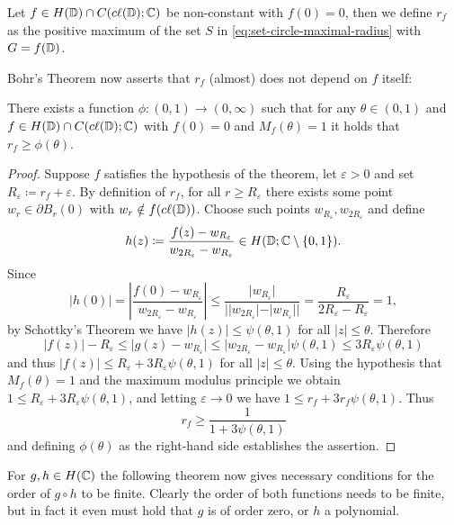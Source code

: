 \begin{definition}
    Let $f \in H(\mathbb{D}) \cap C(c\ell({\mathbb{D}}); \mathbb{C})$ be non-constant with $f(0) = 0$, then we define $r_f$ as the positive maximum of the set $S$ in \eqref{eq:set-circle-maximal-radius} with $G = f(\mathbb{D})$.
\end{definition}

Bohr's Theorem now asserts that $r_f$ (almost) does not depend on $f$ itself:

\begin{theorem}[Bohr] \label{thm:bohr}
    There exists a function ${\phi : (0, 1) \to (0, \infty)}$ such that for any $\theta \in (0, 1)$ and $f \in H(\mathbb{D}) \cap C(c\ell({\mathbb{D}}); \mathbb{C})$ with $f(0) = 0$ and $M_f(\theta) = 1$ it holds that $r_f \geq \phi(\theta)$.
\end{theorem}

\begin{proof}
    Suppose $f$ satisfies the hypothesis of the theorem, let $\varepsilon > 0$ and set $R_\varepsilon \coloneqq r_f + \varepsilon$. By definition of $r_f$, for all $r \geq R_\varepsilon$ there exists some point $w_r \in \partial B_r(0)$ with $w_r \notin f(c\ell({\mathbb{D}}))$. Choose such points $w_{R_\varepsilon}, w_{2 R_\varepsilon}$ and define
    $$ h(z) \coloneqq \frac{f(z) - w_{R_\varepsilon}}{w_{2 R_\varepsilon} - w_{R_\varepsilon}} \in H(\mathbb{D}; \mathbb{C} \setminus \{ 0, 1 \}). $$
    Since
    $$ \vert h(0) \vert = \left\vert \frac{f(0) - w_{R_\varepsilon}}{w_{2 R_\varepsilon} - w_{R_\varepsilon}} \right\vert \leq \frac{\vert w_{R_\varepsilon} \vert}{\vert \vert w_{2 R_\varepsilon} \vert - \vert w_{R_\varepsilon} \vert \vert} = \frac{R_\varepsilon}{2 R_\varepsilon - R_\varepsilon} = 1, $$
    by Schottky's Theorem we have $\vert h(z) \vert \leq \psi(\theta, 1)$ for all $\vert z \vert \leq \theta$. Therefore
    $$ \vert f(z) \vert - R_\varepsilon \leq \vert g(z) - w_{R_\varepsilon} \vert \leq \vert w_{2 R_\varepsilon} - w_{R_\varepsilon} \vert \psi(\theta, 1) \leq 3 R_\varepsilon \psi(\theta, 1) $$
    and thus $\vert f(z) \vert \leq R_\varepsilon + 3 R_\varepsilon \psi(\theta, 1)$ for all $\vert z \vert \leq \theta$. Using the hypothesis that $M_f(\theta) = 1$ and the maximum modulus principle we obtain $1 \leq R_\varepsilon + 3 R_\varepsilon \psi(\theta, 1)$, and letting $\varepsilon \to 0$ we have $1 \leq r_f + 3 r_f \psi(\theta, 1)$. Thus
    $$ r_f \geq \frac{1}{1 + 3 \psi(\theta, 1)}$$
    and defining $\phi(\theta)$ as the right-hand side establishes the assertion.
\end{proof}

For $g, h \in H(\mathbb{C})$ the following theorem now gives necessary conditions for the order of $g \circ h$ to be finite. Clearly the order of both functions needs to be finite, but in fact it even must hold that $g$ is of order zero, or $h$ a polynomial.

